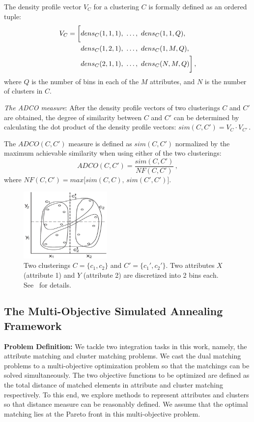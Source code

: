 The density profile vector $V_C$ for a clustering $C$ is formally defined as an ordered tuple:
\begin{align}
\notag V_C = \bigg[ & dens_C(1, 1, 1), ~\ldots, ~dens_C (1, 1, Q),\\
\notag & dens_C (1, 2, 1), ~\ldots, ~dens_C (1, M, Q),\\
& dens_C (2, 1, 1), ~\ldots, ~dens_C (N, M, Q) \bigg]\, ,\label{eq:densp}
\end{align}
where $Q$ is the number of bins in each of the $M$ attributes, and $N$ is the number of clusters in $C$.

\emph{The ADCO measure}: After the density profile vectors of two clusterings $C$ and $C'$ are obtained, the degree of similarity between  $C$ and $C'$ can be determined by calculating the dot product of the density profile vectors:
$sim(C, C') = V_C  \cdot V_{C'} \, .$

The $ADCO(C,C')$ measure is defined as $sim(C,C')$ normalized by the maximum achievable similarity when using either of the two clusterings:
\[ADCO(C, C') = \frac{sim(C, C')}{NF(C, C')} \, , \]
where $NF(C, C') = max \big[sim(C, C), \,sim(C', C')\big]$.

\begin{figure}[tb]
\begin{center}
\includegraphics[width=0.4\textwidth]{fig/density_profile.eps}
\end{center}
\caption[An example of cluster density profiles]{\label{fig:density_profile} Two clusterings $C=\{c_1, c_2\}$ and $C'=\{c_1', c_2'\}$. Two attributes $X$ (attribute 1) and $Y$ (attribute 2) are discretized into 2 bins each. See~\cite{Bae2010} for details.}
\end{figure}

\subsection{The Multi-Objective Simulated Annealing Framework}
\textbf{Problem Definition:} We tackle two integration tasks in this work, namely, the attribute matching and cluster matching problems. We cast the dual matching problems to a multi-objective optimization problem so that the matchings can be solved simultaneously. The two objective functions to be optimized are defined as the total distance of matched elements in attribute and cluster matching respectively. To this end, we explore methods to represent attributes and clusters so that distance measure can be reasonably defined. We assume that the optimal matching lies at the Pareto front in this multi-objective problem.

